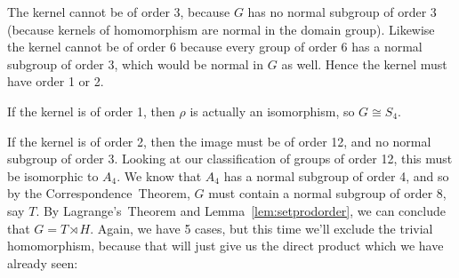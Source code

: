 The kernel cannot be of order 3, because \(G\) has no normal subgroup of order 3 (because kernels of homomorphism are
normal in the domain group).
Likewise the kernel cannot be of order 6 because every group of order 6 has a normal subgroup of order 3, which would be
normal in \(G\) as well.
Hence the kernel must have order 1 or 2.

If the kernel is of order 1, then \(\rho\) is actually an isomorphism, so \(G \cong S_4\).

If the kernel is of order 2, then the image must be of order 12, and no normal subgroup of order 3.
Looking at our classification of groups of order 12, this must be isomorphic to \(A_4\).
We know that \(A_4\) has a normal subgroup of order 4, and so by the Correspondence~Theorem, \(G\) must contain a normal
subgroup of order 8, say \(T\).
By Lagrange's~Theorem and Lemma~\ref{lem:setprodorder}, we can conclude that \(G = T \rtimes H\).
Again, we have 5 cases, but this time we'll exclude the trivial homomorphism, because that will just give us the direct
product which we have already seen:


